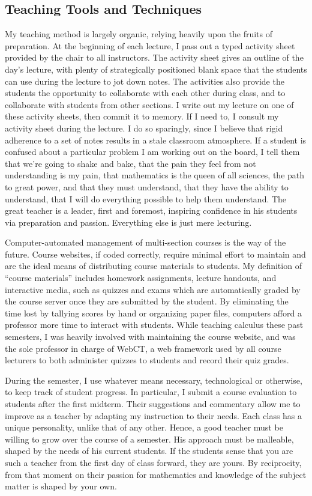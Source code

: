 \documentclass[12pt,oneside]{amsart}
\begin{document}
\subsection{Teaching Tools and Techniques} My teaching method is largely
organic, relying heavily upon the fruits of preparation. At the beginning of
each lecture, I pass out a typed activity sheet provided by the chair to all
instructors. The activity sheet gives an outline of the day's lecture, with
plenty of strategically positioned blank space that the students can use during
the lecture to jot down notes. The activities also provide the students the
opportunity to collaborate with each other during class, and to collaborate with
students from other sections. I write out my lecture on one of these activity
sheets, then commit it to memory. If I need to, I consult my activity sheet
during the lecture. I do so sparingly, since I believe that rigid adherence to a
set of notes results in a stale classroom atmosphere.  If a student is confused
about a particular problem I am working out on the board, I tell them that we're
going to shake and bake, that the pain they feel from not understanding is my
pain, that mathematics is the queen of all sciences, the path to great power,
and that they must understand, that they have the ability to understand, that I
will do everything possible to help them understand. The great teacher is a
leader, first and foremost, inspiring confidence in his students via preparation
and passion. Everything else is just mere lecturing.

Computer-automated management of multi-section courses is the way of the future.
Course websites, if coded correctly, require minimal effort to maintain and are
the ideal means of distributing course materials to students. My definition of
``course materials'' includes homework assignments, lecture
handouts, and interactive media, such as quizzes and exams which are
automatically graded by the course server once they are submitted by the
student. By eliminating the time lost by tallying scores by hand or organizing
paper files, computers afford a professor more time to interact with students.
While teaching calculus these past semesters, I was heavily involved
with maintaining the course website, and was the sole professor in charge of
WebCT, a web framework used by all course lecturers to both administer quizzes
to students and record their quiz grades.

During the semester, I use whatever means necessary, technological
or otherwise, to keep track of student progress. In particular, I submit a
course evaluation to students after the first midterm. Their suggestions and
commentary allow me to improve as a teacher by
adapting my instruction to their needs. Each class has a unique personality,
unlike that of any other. Hence, a good teacher must be willing to grow over the
course of a semester. His approach must be malleable, shaped by the needs of his
current students. If the students sense that you are such a teacher from the first
day of class forward, they are yours. By reciprocity, from that moment on their
passion for mathematics and knowledge of the subject matter is shaped by your own. 
\end{document}
